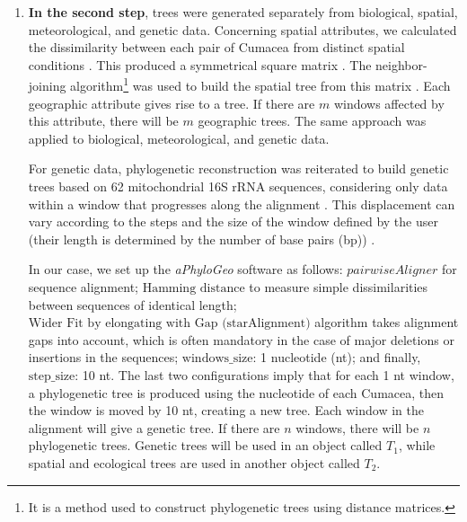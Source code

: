 {\begin{enumerate}
\item \textbf{In the second step}, trees were generated separately from biological, spatial, meteorological, and genetic data. Concerning spatial attributes, we calculated the dissimilarity between each pair of Cumacea from distinct spatial conditions \citep{koshkarov_phylogeography_2022}. This produced a symmetrical square matrix \citep{koshkarov_phylogeography_2022}. The {neighbor-joining algorithm}\footnote{It is a method used to construct phylogenetic trees using distance matrices.} was used to build the spatial tree from this matrix \citep{koshkarov_phylogeography_2022}. Each geographic attribute gives rise to a tree. If there are $m$ windows affected by this attribute, there will be $m$ geographic trees. The same approach was applied to biological, meteorological, and genetic data. 

For genetic data, phylogenetic reconstruction was reiterated to build genetic trees based on 62 mitochondrial 16S rRNA sequences, considering only data within a window that progresses along the alignment \citep{koshkarov_phylogeography_2022}. This displacement can vary according to the steps and the size of the window defined by the user (their length is determined by the number of base pairs (bp)) \citep{koshkarov_phylogeography_2022}. 

In our case, we set up the \textit{aPhyloGeo} software as follows: $pairwiseAligner$ for sequence alignment; $\text{Hamming distance}$ to measure simple dissimilarities between sequences of identical length; $\text{Wider Fit by elongating with Gap (starAlignment)}$ algorithm takes alignment gaps into account, which is often mandatory in the case of major deletions or insertions in the sequences; $\text{windows\_size}$: 1 nucleotide (nt); and finally, $\text{step\_size}$: 10 nt. The last two configurations imply that for each 1 nt window, a phylogenetic tree is produced using the nucleotide of each Cumacea, then the window is moved by 10 nt, creating a new tree. Each window in the alignment will give a genetic tree. If there are $n$ windows, there will be $n$ phylogenetic trees. Genetic trees will be used in an object called $T_1$, while spatial and ecological trees are used in another object called $T_2$.


\end{enumerate}}
